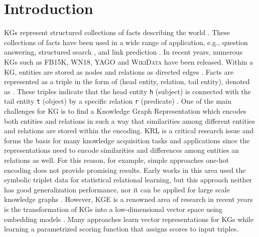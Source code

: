 \chapter{Introduction}
\label{ch:introduction}

\acp{KG} represent structured collections of facts describing the world   \cite{hogan2020knowledge}.
These collections of facts have been used in a wide range of application, e.g., question answering, structured search \cite{zhang2019nscaching}, and link prediction \cite{cai2017kbgan, Alam2020AffinityDN}.
In recent years, numerous \acp{KG} such as \textsc{FB15K}, \textsc{WN18}, \textsc{YAGO} \cite{ConEx} and \textsc{WikiData} \cite{arnaoutwikinegata} have been released.
Within a \ac{KG}, entities are stored as nodes and relations as directed edges \cite{zhang2019nscaching}.
Facts are represented as a triple in the form of (head entity, relation, tail entity), denoted as .
These triples indicate that the head entity \texttt{h} (subject) is connected with the tail entity \texttt{t} (object) by a specific relation \texttt{r} (predicate) \cite{zhang2019nscaching, Alam2020AffinityDN}.
One of the main challenges for \ac{KG} is to find a Knowledge Graph Representation which encodes both entities and relations in such a way that similarities among different entities and relations are stored within the encoding. 
\ac{KRL} is a critical research issue and forms the basis for many knowledge acquisition tasks and applications since the representations need to encode similarities and differences among entities an relations as well.
For this reason, for example, simple approaches one-hot encoding does not provide promising results.
Early works in this area used the symbolic triplet data for statistical relational learning, but this approach neither has good generalization performance, nor it can be applied for large scale knowledge graphs \cite{zhang2021efficient}.
However, \ac{KGE} is a renowned area of research in recent years is the transformation of \acp{KG} into a low-dimensional vector space using embedding models \cite{Alam2020AffinityDN}.
Many approaches learn vector representations for \acp{KG} while learning a parametrized scoring function that assigns scores to input triples.
